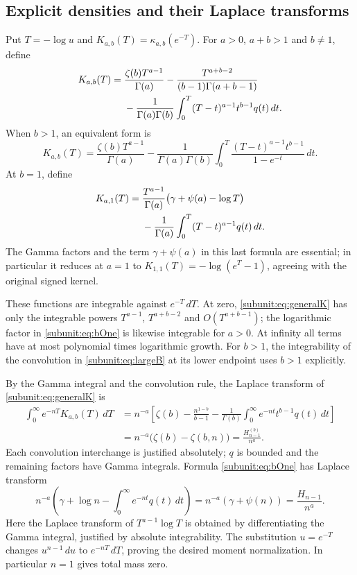 \subsection{Explicit densities and their Laplace transforms}

Put $T=-\log u$ and $K_{a,b}(T)=\kappa_{a,b}(e^{-T})$. For
$a>0$, $a+b>1$ and $b\ne1$, define
\begin{align}\label{subunit:eq:generalK}
 K_{a,b}(T)={}&\frac{\zeta(b)T^{a-1}}{\Gamma(a)}
 -\frac{T^{a+b-2}}{(b-1)\Gamma(a+b-1)}\notag\\
 &-\frac1{\Gamma(a)\Gamma(b)}
    \int_0^T(T-t)^{a-1}t^{b-1}q(t)\,dt.
\end{align}
When $b>1$, an equivalent form is
\begin{equation}\label{subunit:eq:largeB}
 K_{a,b}(T)=\frac{\zeta(b)T^{a-1}}{\Gamma(a)}
 -\frac1{\Gamma(a)\Gamma(b)}
   \int_0^T\frac{(T-t)^{a-1}t^{b-1}}{1-e^{-t}}\,dt.
\end{equation}
At $b=1$, define
\begin{align}\label{subunit:eq:bOne}
 K_{a,1}(T)={}&\frac{T^{a-1}}{\Gamma(a)}
       \bigl(\gamma+\psi(a)-\log T\bigr)\notag\\
 &-\frac1{\Gamma(a)}\int_0^T(T-t)^{a-1}q(t)\,dt.
\end{align}
The Gamma factors and the term $\gamma+\psi(a)$ in this last formula
are essential; in particular it reduces at $a=1$ to
$K_{1,1}(T)=-\log(e^T-1)$, agreeing with the original signed kernel.

These functions are integrable against $e^{-T}\,dT$. At zero,
\eqref{subunit:eq:generalK} has only the integrable powers
$T^{a-1}$, $T^{a+b-2}$ and $O(T^{a+b-1})$; the logarithmic factor
in \eqref{subunit:eq:bOne} is likewise integrable for $a>0$.
At infinity all terms have at most polynomial times logarithmic growth.
For $b>1$, the integrability of the convolution in
\eqref{subunit:eq:largeB} at its lower endpoint uses $b>1$ explicitly.

By the Gamma integral and the convolution rule, the Laplace transform
of \eqref{subunit:eq:generalK} is
\begin{align*}
 \int_0^\infty e^{-nT}K_{a,b}(T)\,dT
  &=n^{-a}\left[\zeta(b)-\frac{n^{1-b}}{b-1}
     -\frac1{\Gamma(b)}\int_0^\infty
                         e^{-nt}t^{b-1}q(t)\,dt\right]\\
  &=n^{-a}\bigl(\zeta(b)-\zeta(b,n)\bigr)
   =\frac{H_{n-1}^{(b)}}{n^a}.
\end{align*}
Each convolution interchange is justified absolutely; $q$ is bounded
and the remaining factors have Gamma integrals. Formula
\eqref{subunit:eq:bOne} has Laplace transform
\[
 n^{-a}\left(\gamma+\log n-\int_0^\infty e^{-nt}q(t)\,dt\right)
 =n^{-a}(\gamma+\psi(n))=\frac{H_{n-1}}{n^a}.
\]
Here the Laplace transform of $T^{a-1}\log T$ is obtained by
differentiating the Gamma integral, justified by absolute integrability.
The substitution $u=e^{-T}$ changes $u^{n-1}\,du$ to
$e^{-nT}\,dT$, proving the desired moment normalization. In particular
$n=1$ gives total mass zero.

